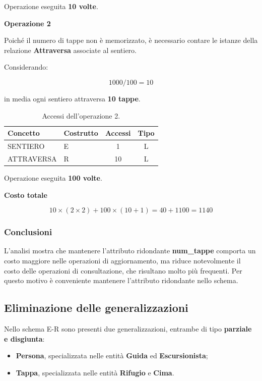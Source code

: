 \documentclass[10pt, a4paper]{article}
\begin{document}
Operazione eseguita \textbf{10 volte}.

\textbf{Operazione 2}

Poiché il numero di tappe non è memorizzato, è necessario contare le istanze della relazione \textbf{Attraversa} associate al sentiero.

Considerando:

\[
1000 / 100 = 10
\]

in media ogni sentiero attraversa \textbf{10 tappe}.

\begin{table}[h]
\centering
\begin{tabular}{l l c c}
\toprule
Concetto & Costrutto & Accessi & Tipo \\
\midrule
SENTIERO & E & 1 & L \\
ATTRAVERSA & R & 10 & L \\
\bottomrule
\end{tabular}
\caption{Accessi dell'operazione 2.}
\end{table}

Operazione eseguita \textbf{100 volte}.

\textbf{Costo totale}

\[
10 \times (2 \times 2) + 100 \times (10 + 1) = 40 + 1100 = 1140
\]


\subsubsection{Conclusioni}

L'analisi mostra che mantenere l'attributo ridondante \textbf{num\_tappe} comporta un costo maggiore nelle operazioni di aggiornamento, ma riduce notevolmente il costo delle operazioni di consultazione, che risultano molto più frequenti. Per questo motivo è conveniente mantenere l'attributo ridondante nello schema.
\subsection{Eliminazione delle generalizzazioni}

Nello schema E-R sono presenti due generalizzazioni, entrambe di tipo \textbf{parziale e disgiunta}:

\begin{itemize}
    \item \textbf{Persona}, specializzata nelle entità \textbf{Guida} ed \textbf{Escursionista};
    \item \textbf{Tappa}, specializzata nelle entità \textbf{Rifugio} e \textbf{Cima}.
\end{itemize}
\end{document}
